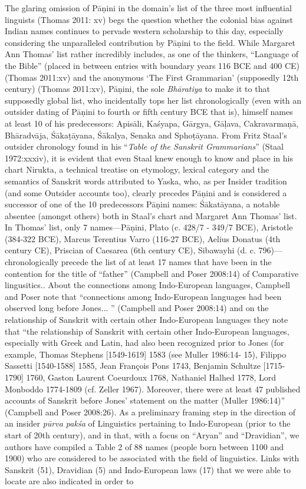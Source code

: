 The glaring omission of Pāṇini in the domain’s list of the three most influential linguists (Thomas 2011: xv) begs the question whether the colonial bias against Indian names continues to pervade western scholarship to this day, especially considering the unparalleled contribution by Pāṇini to the field. While Margaret Ann Thomas’ list rather incredibly includes, as one of the thinkers, “Language of the Bible” (placed in between entries with boundary years 116 BCE and 400 CE) (Thomas 2011:xv) and the anonymous ‘The First Grammarian’ (supposedly 12th century) (Thomas 2011:xv), Pāṇini, the sole \textit{Bhāratiya} to make it to that supposedly global list, who incidentally tops her list chronologically (even with an outsider dating of Pāṇini to fourth or fifth century BCE that is), himself names at least 10 of his predecessors: Apisāli, Kaśyapa, Gārgya, Gāḷava, Cakravarmaṇā, Bhāradvāja, Śākaṭāyana, Śākalya, Senaka and Sphoṭāyana. From Fritz Staal’s outsider chronology found in his “\textit{Table of the Sanskrit Grammarians}” (Staal 1972:xxxiv), it is evident that even Staal knew enough to know and place in his chart Nirukta, a technical treatise on etymology, lexical category and the semantics of Sanskrit words attributed to Yaska, who, as per Insider tradition (and some Outsider accounts too), clearly precedes Pāṇini and is considered a successor of one of the 10 predecessors Pāṇini names: Śākatāyana, a notable absentee (amongst others) both in Staal’s chart and Margaret Ann Thomas’ list. In Thomas’ list, only 7 names—Pāṇini, Plato (c. 428/7 - 349/7 BCE), Aristotle (384-322 BCE), Marcus Terentius Varro (116-27 BCE), Aelius Donatus (4th century CE), Priscian of Caesarea (6th century CE), Sibawayhi (d. c. 796)—chronologically precede the list of at least 17 names that have been in the contention for the title of “father” (Campbell and Poser 2008:14) of Comparative lingusitics.. About the connections among Indo-European languages, Campbell and Poser note that “connections among Indo-European languages had been observed long before Jones... ” (Campbell and Poser 2008:14) and on the relationship of Sanskrit with certain other Indo-European languages they note that “the relationship of Sanskrit with certain other Indo-European languages, especially with Greek and Latin, had also been recognized prior to Jones (for example, Thomas Stephens [1549-1619] 1583 (see Muller 1986:14- 15), Filippo Sassetti [1540-1588] 1585, Jean François Pons 1743, Benjamin Schultze [1715-1790] 1760, Gaston Laurent Coeurdoux 1768, Nathaniel Halhed 1778, Lord Monboddo 1774-1809 (cf. Zeller 1967). Moreover, there were at least 47 published accounts of Sanskrit before Jones’ statement on the matter (Muller 1986:14)” (Campbell and Poser 2008:26). As a preliminary framing step in the direction of an insider \textit{pūrva pakśa} of Linguistics pertaining to Indo-European (prior to the start of 20th century), and in that, with a focus on “Aryan” and “Dravidian”, we authors have compiled a Table 2 of 88 names (people born between 1100 and 1900) who are considered to be associated with the field of linguistics. Links with Sanskrit (51), Dravidian (5) and Indo-European laws (17) that we were able to locate are also indicated in order to 